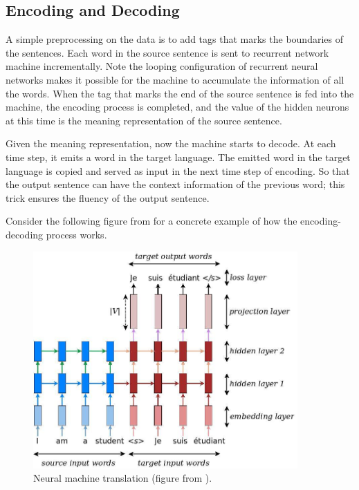 \documentclass[final]{ua-thesis}
\numberwithin{equation}{section}
\begin{document}
\subsection{Encoding and Decoding}

A simple preprocessing on the data is to add tags that marks the boundaries of the sentences. Each word in the source sentence is sent to recurrent network machine incrementally. 
Note the looping configuration of recurrent neural networks makes it possible for the machine to accumulate the information of all the words. When the tag that marks the end of the source sentence is fed into the machine, the encoding process is completed, and the value of the hidden neurons at this time is the meaning representation of the source sentence.  

Given the meaning representation, now the machine starts to decode. At each time step, it emits a word in the target language. The emitted word in the target language is copied and served as input in the next time step of encoding. So that the output sentence can have the context information of the previous word; this trick ensures the fluency of the output sentence. 

Consider the following figure from \citet{luong17GitHub} for a concrete example of how the encoding-decoding process works.  

\begin{figure}[h]
\caption{Neural machine translation (figure from \citet{luong17GitHub}).}
\centering
\includegraphics[width=0.9\textwidth]{seq2seq.jpg}
\end{figure} 
\end{document}
